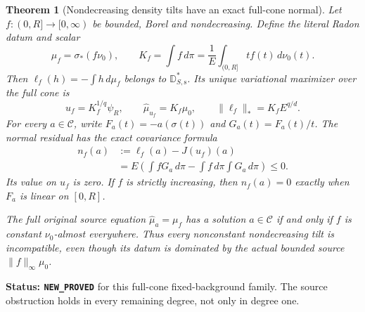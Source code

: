 \documentclass[11pt,a4paper]{article}
\numberwithin{equation}{section}
\newtheorem{theorem}{Theorem}[section]
\theoremstyle{definition}
\theoremstyle{remark}
\begin{document}
\begin{theorem}[Nondecreasing density tilts have an exact full-cone normal]
\label{thm:r12-monotone-density-normal}
Let $f:(0,R]\to[0,\infty)$ be bounded, Borel and
nondecreasing.  Define the literal Radon datum and scalar
\[
 \mu_f=\sigma_*(f\nu_0),\qquad
       K_f=\int f\,d\pi=\frac1E\int_{(0,R]} t f(t)\,d\nu_0(t).
 \tag{SD2}
\]
Then $\ell_f(h)=-\int h\,d\mu_f$ belongs to
$\mathbb D_{S,\mathrm s}^*$.  Its unique variational
maximizer over the full cone is
\[
              u_f=K_f^{1/q}\psi_R,
           \qquad\widehat\mu_{u_f}=K_f\mu_0,
           \qquad\|\ell_f\|_*=K_f E^{q/d}.
 \tag{SD3}
\]
For every $a\in\mathscr C$, write
$F_a(t)=-a(\sigma(t))$ and $G_a(t)=F_a(t)/t$.
The normal residual has the exact covariance formula
\[
 \begin{split}
 n_f(a)&:=\ell_f(a)-J(u_f)(a)\\
   &=E\left(\int fG_a\,d\pi
                   -\int f\,d\pi\int G_a\,d\pi\right)\le0.
 \end{split}
 \tag{SD4}
\]
Its value on $u_f$ is zero.  If $f$ is strictly increasing,
then $n_f(a)=0$ exactly when $F_a$ is linear on $[0,R]$.

The full original source equation
$\widehat\mu_a=\mu_f$ has a solution $a\in\mathscr C$
if and only if $f$ is constant $\nu_0$-almost everywhere.
Thus every nonconstant nondecreasing tilt is incompatible,
even though its datum is dominated by the actual bounded
source $\|f\|_\infty\mu_0$.
\end{theorem}

\noindent\textbf{Status: \texttt{NEW\_PROVED}} for this
full-cone fixed-background family.  The source obstruction
holds in every remaining degree, not only in degree one.
\end{document}
